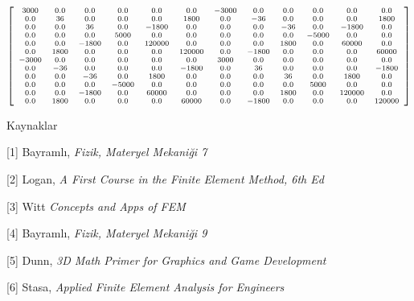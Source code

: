 \documentclass[12pt,fleqn]{article}\usepackage{../../common}
\begin{document}
$$
{\scriptsize
\left[\begin{array}{cccccccccccc}3000 & 0.0 & 0.0 & 0.0 & 0.0 & 0.0 & -3000 & 0.0 & 0.0 & 0.0 & 0.0 & 0.0\\0.0 & 36 & 0.0 & 0.0 & 0.0 & 1800 & 0.0 & -36 & 0.0 & 0.0 & 0.0 & 1800\\0.0 & 0.0 & 36 & 0.0 & -1800 & 0.0 & 0.0 & 0.0 & -36 & 0.0 & -1800 & 0.0\\0.0 & 0.0 & 0.0 & 5000 & 0.0 & 0.0 & 0.0 & 0.0 & 0.0 & -5000 & 0.0 & 0.0\\0.0 & 0.0 & -1800 & 0.0 & 120000 & 0.0 & 0.0 & 0.0 & 1800 & 0.0 & 60000 & 0.0\\0.0 & 1800 & 0.0 & 0.0 & 0.0 & 120000 & 0.0 & -1800 & 0.0 & 0.0 & 0.0 & 60000\\-3000 & 0.0 & 0.0 & 0.0 & 0.0 & 0.0 & 3000 & 0.0 & 0.0 & 0.0 & 0.0 & 0.0\\0.0 & -36 & 0.0 & 0.0 & 0.0 & -1800 & 0.0 & 36 & 0.0 & 0.0 & 0.0 & -1800\\0.0 & 0.0 & -36 & 0.0 & 1800 & 0.0 & 0.0 & 0.0 & 36 & 0.0 & 1800 & 0.0\\0.0 & 0.0 & 0.0 & -5000 & 0.0 & 0.0 & 0.0 & 0.0 & 0.0 & 5000 & 0.0 & 0.0\\0.0 & 0.0 & -1800 & 0.0 & 60000 & 0.0 & 0.0 & 0.0 & 1800 & 0.0 & 120000 & 0.0\\0.0 & 1800 & 0.0 & 0.0 & 0.0 & 60000 & 0.0 & -1800 & 0.0 & 0.0 & 0.0 & 120000\end{array}\right]
}
$$




Kaynaklar

[1] Bayramlı, {\em Fizik, Materyel Mekaniği 7}

[2] Logan, {\em A First Course in the Finite Element Method, 6th Ed}

[3] Witt {\em Concepts and Apps of FEM}

[4] Bayramlı, {\em Fizik, Materyel Mekaniği 9}

[5] Dunn, {\em 3D Math Primer for Graphics and Game Development}

[6] Stasa, {\em Applied Finite Element Analysis for Engineers}
\end{document}
